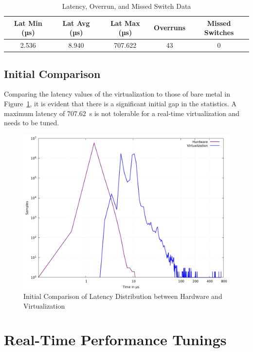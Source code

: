 \documentclass[MMR,Master,english]{twbook}
\begin{document}
\begin{table}[H]
\centering
\begin{tabular}{|c|c|c|c|c|}
\hline
\textbf{Lat Min (µs)} & \textbf{Lat Avg (µs)} & \textbf{Lat Max (µs)} & \textbf{Overruns} & \textbf{Missed Switches} \\ \hline
2.536 & 8.940 & 707.622 & 43 & 0 \\ \hline
\end{tabular}
\caption{Latency, Overrun, and Missed Switch Data}
\label{tab:latency_overrun_msw_new_virt}
\end{table}


\subsection{Initial Comparison}
\noindent Comparing the latency values of the virtualization to those of bare metal in Figure~\ref{fig:gnuplot_max_latency_combined}, it is evident that there is a significant initial gap in the statistics. A maximum latency of 707.62~\textmu s is not tolerable for a real-time virtualization and needs to be tuned.

\begin{figure}[H]
	\centering
	\includegraphics[width=0.7\columnwidth]{masterthesis-documentation/docs/sigmatek/xenomai/01combined/gnuplot_combined_max_latency.png}
	\caption[Initial Comparison of Latency Distribution between Hardware and Virtualization]{Initial Comparison of Latency Distribution between Hardware and Virtualization}
	\label{fig:gnuplot_max_latency_combined}
\end{figure}


\clearpage

\section{Real-Time Performance Tunings}\label{sec:real-time_tunings}
\end{document}
